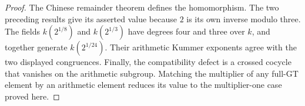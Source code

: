 \begin{proof}
The Chinese remainder theorem defines the homomorphism.
The two preceding results give its asserted value because
$2$ is its own inverse modulo three.
The fields $k(2^{1/8})$ and $k(2^{1/3})$ have degrees four and
three over $k$, and together generate $k(2^{1/24})$.
Their arithmetic Kummer exponents agree with the two displayed
congruences.  Finally, the compatibility defect is a crossed
cocycle that vanishes on the arithmetic subgroup.  Matching
the multiplier of any full-GT element by an arithmetic element
reduces its value to the multiplier-one case proved here.
\end{proof}
